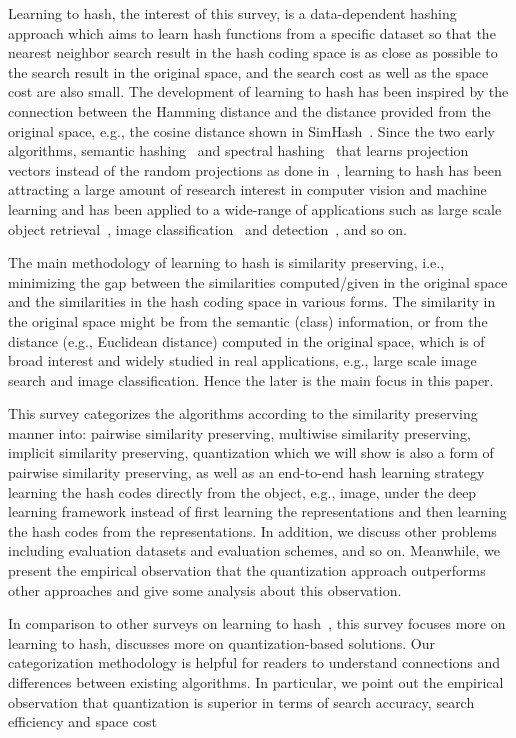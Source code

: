\documentclass[10pt,journal,compsoc]{IEEEtran}
\begin{document}
Learning to hash, the interest of this survey,
is a data-dependent hashing approach
which aims to learn hash functions
from a specific dataset
so that the nearest neighbor search result
in the hash coding space
is as close as possible to the search result
in the original space,
and the search cost as well as the space cost are also small.
The development of learning to hash
has been inspired by the connection between the Hamming distance
and the distance provided from the original space, e.g., the cosine distance
shown in SimHash~\cite{Charikar02}.
Since the two early algorithms,
semantic hashing~\cite{SalakhutdinovH07, SalakhutdinovH09} and spectral hashing~\cite{WeissTF08}
that learns projection vectors instead of the random projections as done in~\cite{Charikar02},
learning to hash has been attracting a large amount of research interest
in computer vision and machine learning
and has been applied to a wide-range of applications
such as large scale object retrieval~\cite{JegouDSP10},
image classification~\cite{SanchezP11} and detection~\cite{VedaldiZ12},
and so on.

The main methodology of learning to hash
is similarity preserving,
i.e.,
minimizing the gap between the similarities
computed/given in the original space
and the similarities in the hash coding space
in various forms.
The similarity in the original space might
be from the semantic (class) information,
or from the distance (e.g., Euclidean distance)
computed in the original space,
which is of broad interest and widely studied in real applications,
e.g., large scale image search and image classification.
Hence the later is the main focus in this paper.


This survey
categorizes the algorithms according to
the similarity preserving manner into:
pairwise similarity preserving,
multiwise similarity preserving,
implicit similarity preserving,
quantization
which we will show is also a form of pairwise similarity preserving,
as well as
an end-to-end hash learning strategy
learning the hash codes directly from the object, e.g., image,
under the deep learning framework
instead of first learning the representations
and then learning the hash codes from the representations.
In addition,
we discuss other problems
including evaluation datasets and evaluation schemes,
and so on.
Meanwhile,
we present the empirical observation
that
the quantization approach
outperforms other approaches
and give some analysis about this observation.

In comparison to other surveys on learning to hash~\cite{WangSSJ14,WangLKC16},
this survey focuses more on learning to hash,
discusses more on quantization-based solutions.
Our categorization methodology is helpful
for readers to understand connections and differences
between existing algorithms.
In particular, we point out
the empirical observation
that quantization is superior
in terms of search accuracy, search efficiency
and space cost
\end{document}
